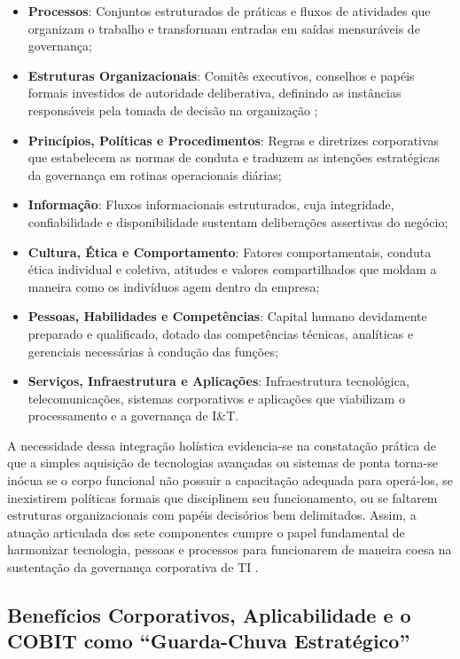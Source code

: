 \begin{itemize}
    \item \textbf{Processos}: Conjuntos estruturados de práticas e fluxos de atividades que organizam o trabalho e transformam entradas em saídas mensuráveis de governança;
    \item \textbf{Estruturas Organizacionais}: Comitês executivos, conselhos e papéis formais investidos de autoridade deliberativa, definindo as instâncias responsáveis pela tomada de decisão na organização \cite{weill2004governance};
    \item \textbf{Princípios, Políticas e Procedimentos}: Regras e diretrizes corporativas que estabelecem as normas de conduta e traduzem as intenções estratégicas da governança em rotinas operacionais diárias;
    \item \textbf{Informação}: Fluxos informacionais estruturados, cuja integridade, confiabilidade e disponibilidade sustentam deliberações assertivas do negócio;
    \item \textbf{Cultura, Ética e Comportamento}: Fatores comportamentais, conduta ética individual e coletiva, atitudes e valores compartilhados que moldam a maneira como os indivíduos agem dentro da empresa;
    \item \textbf{Pessoas, Habilidades e Competências}: Capital humano devidamente preparado e qualificado, dotado das competências técnicas, analíticas e gerenciais necessárias à condução das funções;
    \item \textbf{Serviços, Infraestrutura e Aplicações}: Infraestrutura tecnológica, telecomunicações, sistemas corporativos e aplicações que viabilizam o processamento e a governança de I\&T.
\end{itemize}

A necessidade dessa integração holística evidencia-se na constatação prática de que a simples aquisição de tecnologias avançadas ou sistemas de ponta torna-se inócua se o corpo funcional não possuir a capacitação adequada para operá-los, se inexistirem políticas formais que disciplinem seu funcionamento, ou se faltarem estruturas organizacionais com papéis decisórios bem delimitados. Assim, a atuação articulada dos sete componentes cumpre o papel fundamental de harmonizar tecnologia, pessoas e processos para funcionarem de maneira coesa na sustentação da governança corporativa de TI \cite{fernandes2014implantando,isaca2019framework}.

\subsection{Benefícios Corporativos, Aplicabilidade e o COBIT como ``Guarda-Chuva Estratégico''}

